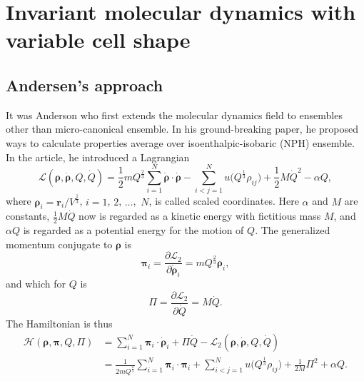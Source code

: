 
\section{Invariant molecular dynamics with variable cell shape}

\subsection{Andersen's approach}

It was Anderson who first extends the molecular dynamics field to
ensembles other than micro-canonical ensemble.\cite{Andersen:1980ew}
In his ground-breaking paper, he proposed ways to calculate properties average
over isoenthalpic-isobaric (NPH) ensemble. In the article, he introduced
a Lagrangian
\begin{equation}\label{eq:lagrang}
	\mathcal{L}(\bm{\rho}, \dot{\bm{\rho}}, Q, \dot{ Q }) = \frac{ 1 }{ 2 } m
	Q^{\frac{ 2 }{ 3 }}
	\sum_{i=1}^{N} \dot{ \bm{\rho} } \cdot \dot{ \bm{\rho} } - \sum_{i<j=1}^{N}
	u \big(Q^{\frac{ 1 }{ 3 }} \rho_{ij} \big) + \frac{ 1 }{ 2 } M \dot{ Q } ^2 -
	\alpha Q,
\end{equation}
where $\bm{\rho}_i = \bm{r}_i / V ^{\frac{ 1 }{ 3 }}$, $i=1$, $2$, $\ldots$,~$N$,
is called scaled coordinates. Here $\alpha$ and $M$ are constants,
$\frac{ 1 }{ 2 } M \dot{ Q }$ now is regarded as a kinetic energy with fictitious
mass $M$,
and $\alpha Q$ is regarded as a potential energy for the motion of $Q$.
The generalized momentum conjugate to $\bm{\rho}$ is
\begin{equation}
	\bm{\pi}_i = \frac{ \partial \mathcal{L}_2 }{ \partial \dot{ \bm{\rho} }_i } =
	m Q^{\frac{ 2 }{ 3 }} \bm{\rho}_i,
\end{equation}
and which for $Q$ is
\begin{equation}
	\Pi = \frac{ \partial \mathcal{L}_2 }{ \partial \dot{Q} } = M \dot{ Q }.
\end{equation}
The Hamiltonian is thus
\begin{equation}
	\begin{split}
		\mathcal{H}(\bm{\rho}, \bm{\pi}, Q, \Pi) &= \sum_{i=1}^{N} \bm{\pi}_i \cdot
		\dot{ \bm{\rho} }_i + \Pi \dot{ Q } - \mathcal{L}_2
		(\bm{\rho}, \dot{\bm{\rho}}, Q, \dot{ Q })\\
		&= \frac{ 1 }{ 2 m Q^{\frac{ 2 }{ 3 }} }
		\sum_{i=1}^{N} \bm{\pi}_i \cdot \bm{\pi}_i
		+ \sum_{i<j=1}^{N} u\big(Q^{\frac{ 1 }{ 3 }} \rho_{ij}\big) + \frac{ 1 }{ 2 M }
		\Pi^2 + \alpha Q.
	\end{split}
\end{equation}
